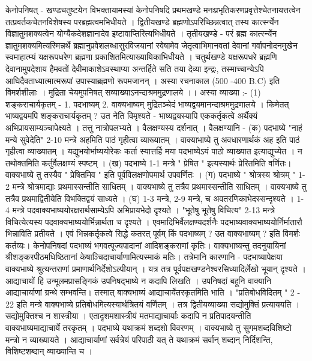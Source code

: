 केनोपनिषत् - 
खण्डचतुष्टयेन विभक्तायामस्यां केनोपनिषदि प्रथमखण्डे मनःप्रभृतिकरणप्रवृत्तेश्चेतनायत्तत्वेन तत्प्रवर्तकचेतनविशेषस्य परब्रह्मत्वमभिधीयते । द्वितीयखण्डे ब्रह्मणोऽपरिच्छिन्नत्वात् तस्य कार्त्स्न्येन विज्ञातुमशक्यत्वेन योग्यैकदेशज्ञानादेव इष्टावाप्तिरित्यभिधीयते । तृतीयखण्डे - परं ब्रह्म कार्त्स्न्येन ज्ञातुमशक्यमित्यस्मिन्नर्थे ब्रह्मानुप्रवेशलब्धासुरविजयानां स्वेषामेव जेतृत्वाभिमानवतां देवानां गर्वापनोदनमुखेन स्वमाहात्म्यं यक्षरूपधरेण ब्रह्मणा प्रकाशितमित्याख्यायिकाभिधीयते । चतुर्थखण्डे यक्षरूपधरे ब्रह्मणि देवानामुपदेशाय हैमवतों देवीमाकाशेऽवस्थाप्या अन्तर्हिते सति तया देव्या इन्द्रः, तस्माच्चान्येऽपि आघिदैवताध्यात्मात्मरूपां उपास्याब्रह्मणो रूपमजानन् । अस्या रचनाकाल (500 -400 B.C) इति विमर्शशीलाः । मुद्रिता चेयमुपनिषत् सव्याख्याऽनन्दाश्रममुद्रणालये ।। 
अस्या व्याख्या :-
 (1) शङ्कराचार्यकृतम् -
 1. पदभाष्यम् 
 2. वाक्यभाष्यम् 
 मुद्रितञ्चेदं भाष्यद्वयमानन्दाश्रममुद्रणालये । किमेतत् भाष्यद्वयमपि शङ्कराचार्यकृतम् ? उत नेति विमृश्यते - 
 भाष्यद्वयस्यापि एककर्तृकत्वे अर्थैक्यं अभिप्रायसाम्यञ्चापेक्ष्यते । तत्तु नात्रोपलभ्यते । वैलक्षण्यस्य दर्शनात् । वैलक्षण्यानि - 
(क) पदभाष्ये "नाहं मन्ये सुवेदेति" 2-10  मन्त्रे अहमिति पाठं गृहीत्वा व्याख्यातम् । वाक्याभाष्ये तु अवधारणार्थकं अह इति पाठं गृहीत्वा व्याख्यातम् । यद्युभयोर्भाष्ययोरेकः कर्ता स्यात्तर्हि मया पदभाष्येऽयं पाठो व्याख्यात इत्याद्युच्येत । न तथोक्तमिति कर्तुर्वैलक्षण्यं स्पष्टम् ।
(ख) पदभाष्ये 1-1 मन्त्रे " प्रेषित " इत्यस्यार्थः प्रेरितमिति वर्णितः। वाक्यभाष्ये तु तस्यैव " प्रेषितमिव " इति पूर्वविलक्षणोपमार्थ उपवर्णितः । 
(ग) पदभाष्ये " श्रोत्रस्य श्रोत्रम् " 1-2 मन्त्रे श्रोत्रमाद्याः प्रथमास्सन्तीति साधितम् । वाक्यभाष्ये तु तत्रैव प्रथमास्सन्तीति साधितम् । वाक्यभाष्ये तु तत्रैव प्रथमाद्वितीयेति विभक्तिद्वयं साध्यते ।
(घ) 1-3 मन्त्रे, 2-9 मन्त्रे, च अवतरणिकाभेदस्सन्दृश्यते । 1-4 मन्त्रे पदवाक्यभाष्ययोरक्षरार्थसाम्येऽपि अभिप्रायभेदो दृश्यते । "भूतेषु भूतेषु विचित्य" 2-13 मन्त्रे विचित्येत्यस्य पदवाक्यभाष्ययोर्भिन्नार्थता च दृश्यते ।   
एवमादिभिर्वैलक्षण्यदर्शनैः पदभाष्यवाक्यभाष्ययोर्निर्मातारौ भिन्नाविति प्रतीयते । एवं भिन्नकर्तृकत्वे सिद्धे कतरत् पूर्वम् किं पदभाष्यम् ? उत वाक्यभाष्यम् ? इति विमर्शः कर्तव्यः।
केनोपनिषदां पदभाष्यं भगवत्पूज्यपादानां आदिशङ्कराणां कृतिः। वाक्यभाष्यन्तु तदनुयायिनां श्रीशङ्करपीठमधिष्ठितानां केषाञ्चिदाचार्याणामित्यस्माकं मतिः। तत्रेमानि कारणानि - 
पदभाष्यापेक्षया वाक्यभाष्ये श्रुत्यन्तराणां प्रमाणार्थनिर्देशोऽल्पीयान् । यत्र तत्र पूर्वपक्षखण्डनेश्वरसिध्यादिर्लेखो भूयान् दृश्यते । आद्याचायों हि उन्मूलमप्रासङ्गिकं उपनिषद्भाष्ये न कदापि लिखति । उपनिषदां बहूनि वाक्यानि आद्याचार्याणां ग्रन्थे सम्भवन्ति। तस्मात् बाक्यभाष्यं आद्याचार्येतरकृतमिति भाति । 
"प्रतिबोधविदितम् " 2 - 22 इति मन्त्रे वाक्यभाष्ये प्रतिबोधमित्यस्यार्थत्रितयं वर्णितम् । तत्र द्वितीयव्याख्या सद्योमुक्तिं प्रत्याययति । सद्योमुक्तिश्च न शास्त्रीया । एतादृशमशास्त्रीयं मतमाद्याचार्याः कदापि न प्रतिपादयन्तीति वाक्यभाष्यमाद्याचार्ये तरकृतम् । पदभाष्ये यथाक्रमं शब्दशो विवरणम् । वाक्यभाष्ये तु सुगमशब्दविशिष्टो मन्त्रो न व्याख्यायते । आद्याचार्याणां सर्वत्रेयं परिपाठी यत् ते यथाक्रमं सर्वान् शब्दान्‌ निर्दिशन्ति, विशिष्टशब्दान् व्याख्यान्ति च ।
